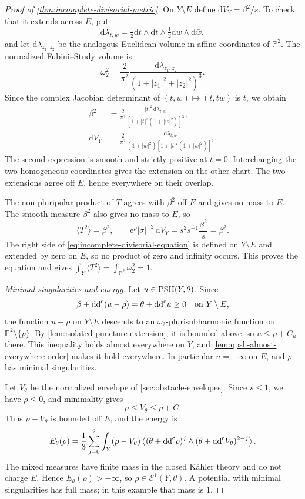 \begin{proof}[Proof of \cref{thm:incomplete-divisorial-metric}]
On $Y\setminus E$ define $\mathrm{d}V_Y=\beta^2/s$. To check that it extends across $E$, put
\[
 \mathrm{d}\lambda_{t,w}
 =\tfrac{\mathrm{i}}2\mathrm{d}t\wedge\mathrm{d}\bar t
       \wedge\tfrac{\mathrm{i}}2\mathrm{d}w\wedge\mathrm{d}\bar w,
\]
and let $\mathrm{d}\lambda_{z_1,z_2}$ be the analogous Euclidean volume in affine coordinates of $\mathbb P^2$. The normalized Fubini--Study volume is
\[
 \omega_2^2=\frac{2}{\pi^2}
 \frac{\mathrm{d}\lambda_{z_1,z_2}}{(1+|z_1|^2+|z_2|^2)^3}.
\]
Since the complex Jacobian determinant of $(t,w)\mapsto(t,tw)$ is $t$, we obtain
\begin{align*}
 \beta^2&=\frac{2}{\pi^2}
 \frac{|t|^2\,\mathrm{d}\lambda_{t,w}}
      {[1+|t|^2(1+|w|^2)]^3},\\
 \mathrm{d}V_Y&=\frac{2}{\pi^2}
 \frac{\mathrm{d}\lambda_{t,w}}
      {(1+|w|^2)[1+|t|^2(1+|w|^2)]^2}.
\end{align*}
The second expression is smooth and strictly positive at $t=0$. Interchanging the two homogeneous coordinates gives the extension on the other chart. The two extensions agree off $E$, hence everywhere on their overlap.

The non-pluripolar product of $T$ agrees with $\beta^2$ off $E$ and gives no mass to $E$. The smooth measure $\beta^2$ also gives no mass to $E$, so
\[
 \langle T^2\rangle=\beta^2,
 \qquad
 \mathrm{e}^{\rho}|\sigma|^{-2}\,\mathrm{d}V_Y
   =s^2s^{-1}\frac{\beta^2}{s}=\beta^2.
\]
The right side of \eqref{eq:incomplete-divisorial-equation} is defined on $Y\setminus E$ and extended by zero on $E$, so no product of zero and infinity occurs. This proves the equation and gives $\int_Y\langle T^2\rangle=\int_{\mathbb P^2}\omega_2^2=1$.

\emph{Minimal singularities and energy.}
Let $u\in\mathrm{PSH}(Y,\theta)$. Since
\[
 \beta+\mathrm{dd}^{\mathrm{c}}(u-\rho)=\theta+\mathrm{dd}^{\mathrm{c}} u\geq0
 \quad\text{on }Y\setminus E,
\]
the function $u-\rho$ on $Y\setminus E$ descends to an $\omega_2$-plurisubharmonic function on $\mathbb P^2\setminus\{p\}$. By \cref{lem:isolated-puncture-extension}, it is bounded above, so $u\leq\rho+C_u$ there. This inequality holds almost everywhere on $Y$, and \cref{lem:qpsh-almost-everywhere-order} makes it hold everywhere. In particular $u=-\infty$ on $E$, and $\rho$ has minimal singularities.

Let $V_\theta$ be the normalized envelope of \cref{sec:obstacle-envelopes}. Since $s\leq1$, we have $\rho\leq0$, and minimality gives
\[
 \rho\leq V_\theta\leq\rho+C.
\]
Thus $\rho-V_\theta$ is bounded off $E$, and the energy is
\[
 E_\theta(\rho)=\frac13\sum_{j=0}^2
 \int_Y(\rho-V_\theta)
 \left\langle(\theta+\mathrm{dd}^{\mathrm{c}}\rho)^j\wedge
                (\theta+\mathrm{dd}^{\mathrm{c}} V_\theta)^{2-j}\right\rangle.
\]
The mixed measures have finite mass in the closed K\"ahler theory and do not charge $E$. Hence $E_\theta(\rho)>-\infty$, so $\rho\in\mathcal E^1(Y,\theta)$. A potential with minimal singularities has full mass; in this example that mass is $1$.


\end{proof}
